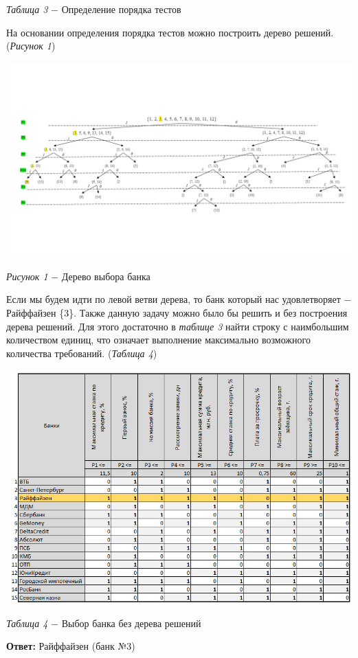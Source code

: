 \documentclass[14pt,fleqn]{extarticle}
\begin{document}
	\begin{center}
		\textit{Таблица 3} $-$ Определение порядка тестов
	\end{center}
	На основании определения порядка тестов можно построить дерево решений. (\textit{Рисунок 1})
	\begin{center}
		\includegraphics[scale=0.54]{4}
	\end{center}
	\begin{center}
		\textit{Рисунок 1} $-$ Дерево выбора банка
	\end{center}
	Если мы будем идти по левой ветви дерева, то банк который нас удовлетворяет $-$ Райффайзен \{3\}.
	Также данную задачу можно было бы решить и без построения дерева решений. Для этого достаточно в \textit{таблице 3} найти строку с наимбольшим количеством единиц, что означает выполнение максимально возможного количества требований. (\textit{Таблица 4})
	\newpage
	\begin{center}
		\includegraphics[scale=0.54]{5}
	\end{center}
	\begin{center}
		\textit{Таблица 4} $-$ Выбор банка без дерева решений
	\end{center}
	\textbf{Ответ:} Райффайзен (банк №3)
\end{document}

